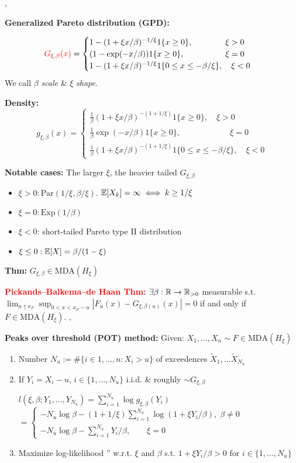 \sep

\textbf{Generalized Pareto distribution (GPD):}

\[\textcolor{red}{G_{\xi,\beta}(x)}=
\begin{cases}
1-(1+\xi x/\beta)^{-1/\xi}1\{ x\geq 0 \},\quad\quad\quad\quad \xi>0\\
(1-\exp(-x/\beta))1\{ x\geq 0 \},\quad\quad\quad\quad\quad \xi=0\\
1-(1+\xi x/\beta)^{-1/\xi}1\{0\leq x\leq -\beta/\xi\},\quad \xi<0\\
\end{cases}\]
We call $\beta$ \textit{scale} \& $\xi$ \textit{shape}.

\textbf{Density:}
\[g_{\xi,\beta}(x)=
\begin{cases}
\frac{1}{\beta}(1+\xi x/\beta)^{-(1+1/\xi)}1\{x\geq0\},\quad \xi>0\\
\frac{1}{\beta}\exp(-x/\beta)1\{x\geq0\},\quad\quad\quad\quad\quad\quad \xi=0\\
\frac{1}{\beta}(1+\xi x/\beta)^{-(1+1/\xi)}1\{0\leq x\leq-\beta/\xi\},\quad \xi<0
\end{cases}\]

\textbf{Notable cases:} The larger $\xi$, the heavier tailed $G_{\xi,\beta}$
\begin{itemize}
    \item $\xi>0:\text{Par}(1/\xi, \beta/\xi)$. $\mathbb{E}[X_k ] = \infty \iff k \geq 1/\xi$
    \item $\xi=0: \text{Exp}(1/\beta)$
    \item $\xi<0$: short-tailed Pareto type II distribution
    \item $\xi \leq 0: \mathbb{E}[X] = \beta/(1 - \xi)$
\end{itemize}

\textbf{Thm:} $G_{\xi,\beta} \in \text{MDA}(H_\xi )$

\textcolor{red}{\textbf{Pickands–Balkema–de Haan Thm:}}
$\exists \beta:\mathbb{R}\rightarrow\mathbb{R}_{>0}$ measurable s.t. $\lim
_{u\uparrow x_F}\sup_{0<x<x_F-u}|F_u(x) - G_{\xi,\beta(u)}(x)|= 0$
if and only if $F\in \text{MDA}(H_\xi)$.
\sep

\textbf{Peaks over threshold (POT) method:}
Given: $X_1,\dots, X_n \sim F \in \text{MDA}(H_\xi )$
\begin{enumerate}
    \item Number $N_u := \#\{i \in {1,\dots, n} : X_i > u\}$ of exceedences $\tilde X_1,\dots \tilde X_{N_u}$
    \item If $Y_i=X_i-u$, $i\in\{1,\dots,N_u\}$ i.i.d. \& roughly $\sim G_{\xi,\beta}$
    
    $l(\xi,\beta;Y_1,\dots,Y_{N_u})=\sum^{N_u}_{i=1} \log g_{\xi,\beta}(Y_i)$\\ 
    $=\begin{cases}
    -N_u\log\beta - (1+1/\xi)\sum^{N_u}_{i=1}\log(1+\xi Y_i/ \beta),\; \beta\neq 0\\
    -N_u\log\beta - \sum^{N_u}_{i=1} Y_i / \beta,\quad\quad \xi=0
    \end{cases}$
    \item Maximize log-likelihood '' w.r.t. $\xi$ and $\beta$ s.t. $1+\xi Y_i/\beta>0$ for $i\in\{1,\dots,N_u\}$
\end{enumerate}


